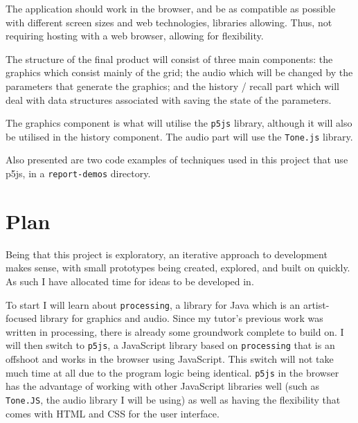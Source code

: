 The application should work in the browser, and be as compatible as possible
with different screen sizes and web technologies, libraries allowing. Thus, not
requiring hosting with a web browser, allowing for flexibility.

The structure of the final product will consist of three main components: the
graphics which consist mainly of the grid; the audio which will be changed by the
parameters that generate the graphics; and the history / recall part which will
deal with data structures associated with saving the state of the parameters.

The graphics component is what will utilise the \verb|p5js| library, although it
will also be utilised in the history component. The audio part will use the
\verb|Tone.js| library.

Also presented are two code examples of techniques used in this project that use
p5js, in a \verb|report-demos| directory.

\section{Plan}
Being that this project is exploratory, an iterative approach to
development makes sense, with small prototypes being created, explored, and
built on quickly. As such I have allocated time for ideas to be developed in.

To start I will learn about \verb|processing|, a library for Java which is an
artist-focused library for graphics and audio. Since my tutor's previous work
was written in processing, there is already some groundwork complete to build
on. I will then switch to \verb|p5js|, a JavaScript library based on
\verb|processing| that is an offshoot and works in the browser using JavaScript.
This switch will not take much time at all due to the program logic being
identical. \verb|p5js| in the browser has the advantage of working with other
JavaScript libraries well (such as \verb|Tone.JS|, the audio library I will be
using) as well as having the flexibility that comes with HTML and CSS for the
user interface.

